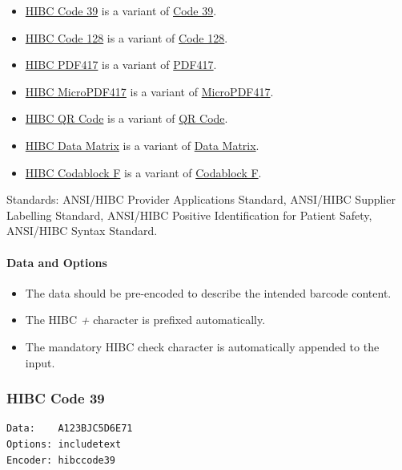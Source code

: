 \begin{itemize}
\tightlist
\item
  \protect\hyperlink{hibc-code-39}{HIBC Code 39} is a variant of
  \protect\hyperlink{code-39}{Code 39}.
\item
  \protect\hyperlink{hibc-code-128}{HIBC Code 128} is a variant of
  \protect\hyperlink{code-128}{Code 128}.
\item
  \protect\hyperlink{hibc-pdf417}{HIBC PDF417} is a variant of
  \protect\hyperlink{pdf417}{PDF417}.
\item
  \protect\hyperlink{hibc-micropdf417}{HIBC MicroPDF417} is a variant of
  \protect\hyperlink{micropdf417}{MicroPDF417}.
\item
  \protect\hyperlink{hibc-qr-code}{HIBC QR Code} is a variant of
  \protect\hyperlink{qr-code}{QR Code}.
\item
  \protect\hyperlink{hibc-data-matrix}{HIBC Data Matrix} is a variant of
  \protect\hyperlink{data-matrix}{Data Matrix}.
\item
  \protect\hyperlink{hibc-codablock-f}{HIBC Codablock F} is a variant of
  \protect\hyperlink{codablock-f}{Codablock F}.
\end{itemize}

Standards: ANSI/HIBC Provider Applications Standard, ANSI/HIBC Supplier
Labelling Standard, ANSI/HIBC Positive Identification for Patient
Safety, ANSI/HIBC Syntax Standard.

\hypertarget{data-and-options-58}{%
\paragraph{Data and Options}\label{data-and-options-58}}

\begin{itemize}
\tightlist
\item
  The data should be pre-encoded to describe the intended barcode
  content.
\item
  The HIBC \emph{+} character is prefixed automatically.
\item
  The mandatory HIBC check character is automatically appended to the
  input.
\end{itemize}

\hypertarget{hibc-code-39}{%
\subsubsection{HIBC Code 39}\label{hibc-code-39}}

\begin{verbatim}
Data:    A123BJC5D6E71
Options: includetext
Encoder: hibccode39
\end{verbatim}

